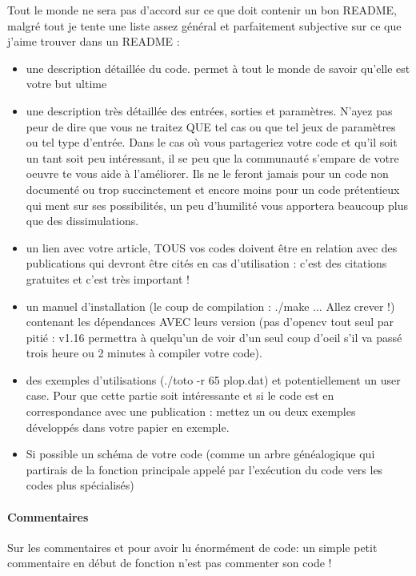 \documentclass[a4paper,10pt]{book_ad}
\begin{document}
Tout le monde ne sera pas d'accord sur ce que doit contenir un bon README, malgré tout je tente une
 liste assez général et parfaitement subjective sur ce que j'aime trouver dans un README : 
\begin{itemize}
\item une description détaillée du code. permet à tout le monde de savoir qu'elle est votre but ultime
\item une description très détaillée des entrées, sorties et paramètres. N'ayez pas peur de dire que
 vous ne traitez QUE tel cas ou que tel jeux de paramètres ou tel type d'entrée. Dans le cas où vous 
partageriez votre code et qu'il soit un tant soit peu intéressant, il se peu que la communauté s'empare 
de votre oeuvre te vous aide à l'améliorer. Ils ne le feront jamais pour un code non documenté ou trop
 succinctement et encore moins pour un code prétentieux qui ment sur ses possibilités, un peu d'humilité 
vous apportera beaucoup plus que des dissimulations.
\item un lien avec votre article, TOUS vos codes doivent être en relation avec des publications qui 
devront être cités en cas d'utilisation : c'est des citations gratuites et c'est très important ! 
\item un manuel d'installation (le coup de compilation : ./make ... Allez crever !) contenant les 
dépendances AVEC leurs version (pas d'opencv tout seul par pitié : v1.16 permettra à quelqu'un de 
voir d'un seul coup d'oeil s'il va passé trois heure ou 2 minutes à compiler votre code).
\item des exemples d'utilisations (./toto -r 65 plop.dat) et potentiellement un user case. Pour que
 cette partie soit intéressante et si le code est en correspondance avec une publication : mettez 
un ou deux exemples développés dans votre papier en exemple.
\item Si possible un schéma de votre code (comme un arbre généalogique qui partirais de la fonction
 principale appelé par l'exécution du code vers les codes plus spécialisés)
\end{itemize}

\paragraph{Commentaires}

Sur les commentaires et pour avoir lu énormément de code: un simple petit commentaire en début de 
fonction n'est pas commenter son code ! \\
\end{document}
